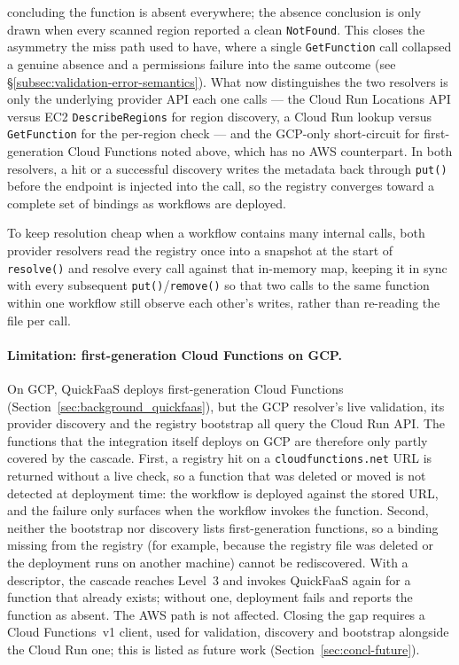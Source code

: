 concluding the function is absent everywhere; the absence conclusion is only drawn when every
scanned region reported a clean \texttt{NotFound}. This closes the asymmetry the miss path used to
have, where a single \texttt{GetFunction} call collapsed a genuine absence and a permissions
failure into the same outcome (see \S\ref{subsec:validation-error-semantics}). What now
distinguishes the two resolvers is only the underlying provider API each one calls --- the Cloud
Run Locations API versus EC2 \texttt{DescribeRegions} for region discovery, a Cloud Run lookup
versus \texttt{GetFunction} for the per-region check --- and the GCP-only short-circuit for
first-generation Cloud Functions noted above, which has no AWS counterpart. In both resolvers, a hit or a
successful discovery writes the metadata back through \texttt{put()} before the endpoint is
injected into the call, so the registry converges toward a complete set of bindings as workflows
are deployed.

To keep resolution cheap when a workflow contains many internal calls, both provider resolvers
read the registry once into a snapshot at the start of \texttt{resolve()} and resolve every call
against that in-memory map, keeping it in sync with every subsequent \texttt{put()}/\texttt{remove()}
so that two calls to the same function within one workflow still observe each other's writes,
rather than re-reading the file per call.

\paragraph{Limitation: first-generation Cloud Functions on GCP.}
On GCP, QuickFaaS deploys first-generation Cloud Functions (Section~\ref{sec:background_quickfaas}),
but the GCP resolver's live validation, its provider discovery and the registry bootstrap all query
the Cloud Run API. The functions that the integration itself deploys on GCP are therefore only
partly covered by the cascade. First, a registry hit on a \texttt{cloudfunctions.net} URL is
returned without a live check, so a function that was deleted or moved is not detected at
deployment time: the workflow is deployed against the stored URL, and the failure only surfaces
when the workflow invokes the function. Second, neither the bootstrap nor discovery lists
first-generation functions, so a binding missing from the registry (for example, because the
registry file was deleted or the deployment runs on another machine) cannot be rediscovered. With a
descriptor, the cascade reaches Level~3 and invokes QuickFaaS again for a function that already
exists; without one, deployment fails and reports the function as absent. The AWS path is not
affected. Closing the gap requires a Cloud Functions~v1 client, used for validation, discovery and
bootstrap alongside the Cloud Run one; this is listed as future work (Section~\ref{sec:concl-future}).

